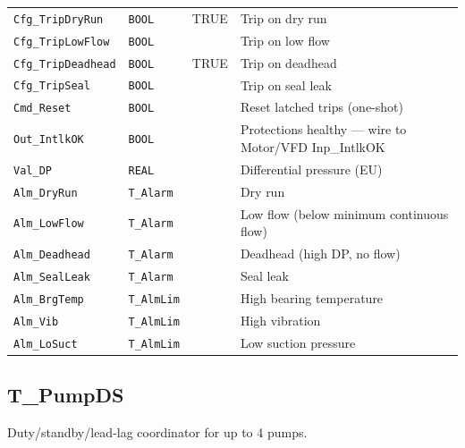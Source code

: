 \begin{small}
\begin{longtable}{@{}P{3.70cm}P{2.20cm}P{1.70cm}P{8.91cm}@{}}
\texttt{Cfg\_TripDryRun} & \texttt{BOOL} & TRUE & Trip on dry run \\
\texttt{Cfg\_TripLowFlow} & \texttt{BOOL} &  & Trip on low flow \\
\texttt{Cfg\_TripDeadhead} & \texttt{BOOL} & TRUE & Trip on deadhead \\
\texttt{Cfg\_TripSeal} & \texttt{BOOL} &  & Trip on seal leak \\
\texttt{Cmd\_Reset} & \texttt{BOOL} &  & Reset latched trips (one-shot) \\
\texttt{Out\_IntlkOK} & \texttt{BOOL} &  & Protections healthy --- wire to Motor/\allowbreak{}VFD Inp\_IntlkOK \\
\texttt{Val\_DP} & \texttt{REAL} &  & Differential pressure (EU) \\
\texttt{Alm\_DryRun} & \texttt{T\_Alarm} &  & Dry run \\
\texttt{Alm\_LowFlow} & \texttt{T\_Alarm} &  & Low flow (below minimum continuous flow) \\
\texttt{Alm\_Deadhead} & \texttt{T\_Alarm} &  & Deadhead (high DP, no flow) \\
\texttt{Alm\_SealLeak} & \texttt{T\_Alarm} &  & Seal leak \\
\texttt{Alm\_BrgTemp} & \texttt{T\_AlmLim} &  & High bearing temperature \\
\texttt{Alm\_Vib} & \texttt{T\_AlmLim} &  & High vibration \\
\texttt{Alm\_LoSuct} & \texttt{T\_AlmLim} &  & Low suction pressure \\
\bottomrule
\end{longtable}
\end{small}

\subsection{T\_PumpDS}\label{sec:pclib-t-pumpds}

Duty/\allowbreak{}standby/\allowbreak{}lead-lag coordinator for up to 4 pumps.

\par{}\par

